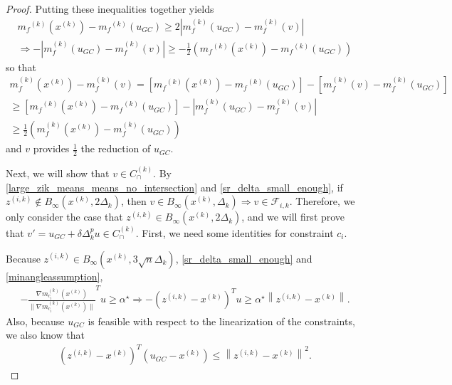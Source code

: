 \documentclass{article}
\theoremstyle{case}
\newcommand{\capcones}{{C^{(k)}_{\cap}}}
\newcommand{\dk}{\Delta_k}
\newcommand{\fik}{{\mathcal F_{i, k}}}
\newcommand{\gk}{{\nabla m_f^{(k)}(x^{(k)})}}
\newcommand{\gmcik}{{\nabla m_{c_i}^{(k)}\left(\xk\right)}}
\newcommand{\maxgrad}{{M_{\nabla}}}
\newcommand{\maxhessian}{{M_{\nabla^2}}}
\newcommand{\mfk}{{{m}_f}^{(k)}}
\newcommand{\minanglealpha}{{ \alpha^{\star} }}
\newcommand{\tr}{{ B_{\infty}\left(\xk, \dk\right) }}
\newcommand{\xk}{{x^{(k)}}}
\newcommand{\zik}{{z^{(i, k)}}}
\begin{document}
\begin{proof}
Putting these inequalities together yields
\begin{align*}
\mfk(\xk) - \mfk(u_{GC}) \ge 2\left|m_f^{(k)}(u_{GC}) - m_f^{(k)}(v)\right| \\
\Longrightarrow -\left|m_f^{(k)}(u_{GC}) - m_f^{(k)}(v)\right| \ge -\frac 1 2 \left(\mfk(\xk) - \mfk(u_{GC})\right)
\end{align*}
so that
\begin{align}
m_f^{(k)}(\xk) - m_f^{(k)}(v) = \left[\mfk(\xk) - \mfk(u_{GC})\right] - \left[m_f^{(k)}(v) - m_f^{(k)}(u_{GC})\right] \nonumber \\
 \ge \left[\mfk(\xk) - \mfk(u_{GC})\right] - \left|m_f^{(k)}(u_{GC}) - m_f^{(k)}(v) \right| \nonumber \\
\ge \frac 1 2 \left(m_f^{(k)}(\xk) - m_f^{(k)}(u_{GC})\right) \label{sr_sr}
\end{align}
and $v$ provides $\frac 1 2$ the reduction of $u_{GC}$.

Next, we will show that $v \in \capcones$.
By \cref{large_zik_means_means_no_intersection} and \cref{sr_delta_small_enough}, if $\zik \not \in B_{\infty}(\xk, 2\dk)$, then $v \in \tr \Longrightarrow v \in \fik$.
Therefore, we only consider the case that $\zik \in B_{\infty}(\xk, 2\dk)$, and we will first prove that $v' = u_{GC} + \delta \dk^{p} u \in \capcones$.
First, we need some identities for constraint $c_i$.

Because $\zik \in B_{\infty}(\xk, 3\sqrt{n} \dk)$, \cref{sr_delta_small_enough} and \cref{minangleassumption}, 
\begin{align}
-\frac {\gmcik}{\|\gmcik\|} ^Tu \ge \minanglealpha \Longrightarrow -\left(\zik - \xk\right)^Tu \ge \minanglealpha \left\|\zik - \xk\right\|. \label{u_is_feasible}
\end{align}
Also, because $u_{GC}$ is feasible with respect to the linearization of the constraints, we also know that
\begin{align}
\left(\zik - \xk\right)^T(u_{GC} - \xk) \le \left\|\zik - \xk\right\|^2. \label{gc_is_feasible}
\end{align}


\end{proof}
\end{document}
